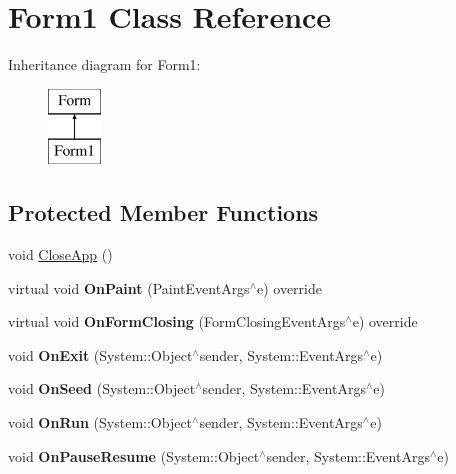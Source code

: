 \hypertarget{classForm1}{}\section{Form1 Class Reference}
\label{classForm1}
Inheritance diagram for Form1\+:\begin{figure}[H]
\begin{center}
\leavevmode
\includegraphics[height=2.000000cm]{classForm1}
\end{center}
\end{figure}
\subsection*{Protected Member Functions}
\begin{DoxyCompactItemize}
\item 
void \hyperlink{classForm1_acb5980c6a00dd4c0b0b65040046a3d61}{Close\+App} ()
\item 
\hypertarget{classForm1_a143ede89715233d16a54e31e6d010252}{}virtual void {\bfseries On\+Paint} (Paint\+Event\+Args$^\wedge$e) override\label{classForm1_a143ede89715233d16a54e31e6d010252}

\item 
\hypertarget{classForm1_a7c67eb57ef06dda8ff8985dd4f3c5eee}{}virtual void {\bfseries On\+Form\+Closing} (Form\+Closing\+Event\+Args$^\wedge$e) override\label{classForm1_a7c67eb57ef06dda8ff8985dd4f3c5eee}

\item 
\hypertarget{classForm1_a3fe1f534466493627abd755f86b4a56c}{}void {\bfseries On\+Exit} (System\+::\+Object$^\wedge$sender, System\+::\+Event\+Args$^\wedge$e)\label{classForm1_a3fe1f534466493627abd755f86b4a56c}

\item 
\hypertarget{classForm1_afb1ce730b487df3bdefbab5ad5ed9ab1}{}void {\bfseries On\+Seed} (System\+::\+Object$^\wedge$sender, System\+::\+Event\+Args$^\wedge$e)\label{classForm1_afb1ce730b487df3bdefbab5ad5ed9ab1}

\item 
\hypertarget{classForm1_a52bcf6b4f64bccacd9509b0ef7868843}{}void {\bfseries On\+Run} (System\+::\+Object$^\wedge$sender, System\+::\+Event\+Args$^\wedge$e)\label{classForm1_a52bcf6b4f64bccacd9509b0ef7868843}

\item 
\hypertarget{classForm1_afff175ad6a31b3810bc6bcaa0abe6080}{}void {\bfseries On\+Pause\+Resume} (System\+::\+Object$^\wedge$sender, System\+::\+Event\+Args$^\wedge$e)\label{classForm1_afff175ad6a31b3810bc6bcaa0abe6080}

\end{DoxyCompactItemize}


